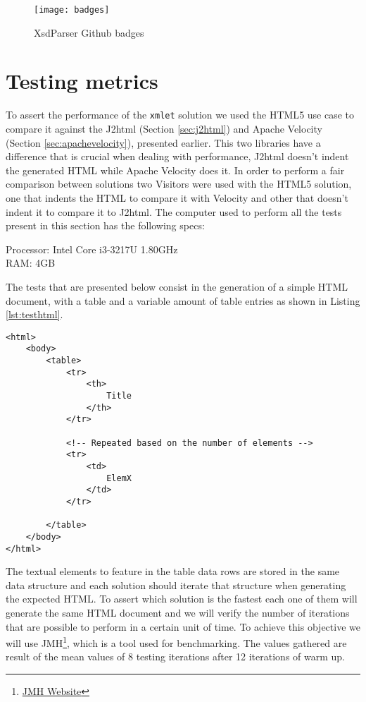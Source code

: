 \begin{figure}[h]
	\centering
	\texttt{[image: badges]}
	\caption{XsdParser Github badges}
	\label{project_badges}
\end{figure}

\section{Testing metrics} %
\label{sec:testingmetrics}

To assert the performance of the \texttt{xmlet} solution we used the \ac{HTML}5 use case to compare it against the J2html (Section \ref{sec:j2html}) and Apache Velocity (Section \ref{sec:apachevelocity}), presented earlier. This two libraries have a difference that is crucial when dealing with performance, J2html doesn't indent the generated \ac{HTML} while Apache Velocity does it. In order to perform a fair comparison between solutions two Visitors were used with the \ac{HTML}5 solution, one that indents the \ac{HTML} to compare it with Velocity and other that doesn't indent it to compare it to J2html. The computer used to perform all the tests present in this section has the following specs:

Processor: Intel Core i3-3217U 1.80GHz\\
RAM: 4GB

\noindent
The tests that are presented below consist in the generation of a simple \ac{HTML} document, with a table and a variable amount of table entries as shown in Listing \ref{lst:testhtml}. 

\bigskip

\lstset{language=html}

\begin{minipage}{\linewidth}
\begin{lstlisting}[caption={Test HTML}, label={lst:testhtml}]
<html>
    <body>
        <table>
            <tr>
                <th>
                    Title
                </th>
            </tr>
            
            <!-- Repeated based on the number of elements -->
            <tr>
                <td>
                    ElemX
                </td>
            </tr>
            
        </table>
    </body>
</html>
\end{lstlisting}
\end{minipage}

The textual elements to feature in the table data rows are stored in the same data structure and each solution should iterate that structure when generating the expected \ac{HTML}. To assert which solution is the fastest each one of them will generate the same \ac{HTML} document and we will verify the number of iterations that are possible to perform in a certain unit of time. To achieve this objective we will use \ac{JMH}\footnote{\href{http://openjdk.java.net/projects/code-tools/jmh/}{JMH Website}}, which is a tool used for benchmarking. The values gathered are result of the mean values of 8 testing iterations after 12 iterations of warm up. 

